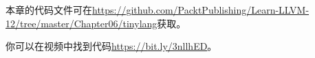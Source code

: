 本章的代码文件可在\url{https://github.com/PacktPublishing/Learn-LLVM-12/tree/master/Chapter06/tinylang}获取。\par

你可以在视频中找到代码\url{https://bit.ly/3nllhED}。\par